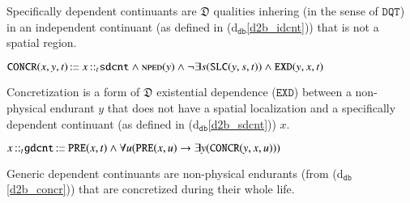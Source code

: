 \documentclass[ao]{iosart2x}
\newcommand{\dolceThrLabel}{\textrm{t$_\texttt{d}$}}
\newcommand{\dbDefLabel}{\textrm{d$_\texttt{db}$}}
\newcounter{cntdbdf}
\newcommand{\dbdf}[1]{\refstepcounter{cntdbdf}\begin{small}{\bf \dbDefLabel\thecntdbdf\label{#1}}\end{small}}
\newcommand{\refdolceth}[1]{({\dolceThrLabel}\ref{#1})}
\newcommand{\refdbdf}[1]{({\dbDefLabel}\ref{#1})}
\newcommand{\pr}[1]{\mathtt{#1}}
\newcommand{\cn}[1]{\mathtt{#1}}
\newcommand\textequal{%
 \rule[.08ex]{5pt}{0.35pt}\llap{\rule[.78ex]{5pt}{0.35pt}}}
\newcommand{\sdef}{{\hspace{1.5pt}:\hspace{-2.5pt}\textequal\hspace{3pt}}}
\newcommand{\dolce}{{\textsc{dolce}}}
\newcommand{\bfo}{{\textsc{bfo}}}
\newcommand {\thdolce} {\ensuremath{\mathfrak{D}}}
\newcommand {\NPEDdcat} {\textsc{nped}}
\newcommand {\Sdcat} {\textsc{s}}
\newcommand {\PREd} {\ensuremath{\pr{PRE}}}
\newcommand {\DQTd} {\ensuremath{\pr{DQT}}}
\newcommand {\EXDd} {\ensuremath{\pr{EXD}}}
\newcommand {\SLCd} {\ensuremath{\pr{SLC}}}
\newcommand{\idcntbcat}{\cn{idcnt}}
\newcommand{\gdcntbcat}{\cn{gdcnt}}
\newcommand{\sdcntbcat}{\cn{sdcnt}}
\newcommand{\rlzenbcat}{\cn{rlzen}}
\newcommand{\qltbcat}{\cn{qlt}}
\newcommand{\bfoiof}[1]{{\,::_{#1\:\!}}}
\newcommand{\bfoconcr}{\pr{CONCR}}
\begin{document}
\vspace{1pt}
Specifically dependent continuants are $\thdolce$ qualities inhering (in the sense of $\DQTd$) in an independent continuant (as defined in \refdbdf{d2b_idcnt}) that is not a spatial region.

%
%
%
%

\item[\dbdf{d2b_concr}] $\bfoconcr(x,y,t) \sdef x \bfoiof{t} \sdcntbcat \land \NPEDdcat(y) \land \neg\exists s(\SLCd(y,s,t))  \land \EXDd(y,x,t)$

\vspace{1pt}
Concretization is a form of $\thdolce$ existential dependence ($\EXDd$) between a non-physical endurant $y$ that does not have a spatial localization and a specifically dependent continuant (as defined in \refdbdf{d2b_sdcnt}) $x$.

%

\item[\dbdf{d2b_gdcnt}] $x \bfoiof{t} \gdcntbcat \sdef \PREd(x,t) \land \forall u(\PREd(x,u) \to \exists y(\bfoconcr(y,x,u)))$

\vspace{1pt}
Generic dependent continuants are non-physical endurants (from \refdbdf{d2b_concr}) that are concretized during their whole life.

%
%
%
%
%
\end{document}
